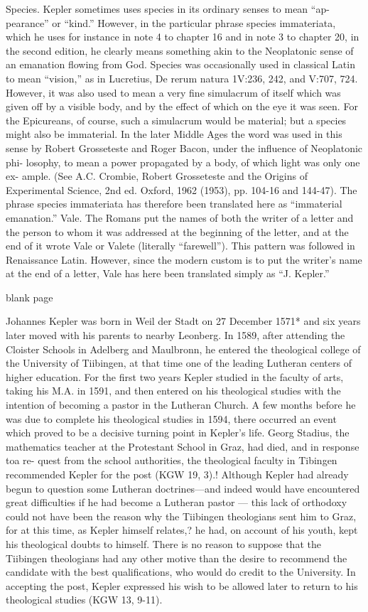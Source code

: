 \documentclass{article}
\begin{document}
Species. Kepler sometimes uses species in its ordinary senses to mean “ap-
pearance” or “kind.” However, in the particular phrase species immateriata,
which he uses for instance in note 4 to chapter 16 and in note 3 to chapter 20, in
the second edition, he clearly means something akin to the Neoplatonic sense of
an emanation flowing from God. Species was occasionally used in classical Latin
to mean “vision,” as in Lucretius, De rerum natura 1V:236, 242, and V:707, 724.
However, it was also used to mean a very fine simulacrum of itself which was
given off by a visible body, and by the effect of which on the eye it was seen. For
the Epicureans, of course, such a simulacrum would be material; but a species
might also be immaterial. In the later Middle Ages the word was used in this sense
by Robert Grosseteste and Roger Bacon, under the influence of Neoplatonic phi-
losophy, to mean a power propagated by a body, of which light was only one ex-
ample. (See A.C. Crombie, Robert Grosseteste and the Origins of Experimental
Science, 2nd ed. Oxford, 1962 (1953), pp. 104-16 and 144-47). The phrase species
immateriata has therefore been translated here as “immaterial emanation.”
Vale. The Romans put the names of both the writer of a letter and the person to
whom it was addressed at the beginning of the letter, and at the end of it wrote
Vale or Valete (literally “farewell”). This pattern was followed in Renaissance
Latin. However, since the modern custom is to put the writer’s name at the end of
a letter, Vale has here been translated simply as “J. Kepler.”

blank page


Johannes Kepler was born in Weil der Stadt on 27 December 1571* and
six years later moved with his parents to nearby Leonberg. In 1589, after
attending the Cloister Schools in Adelberg and Maulbronn, he entered the
theological college of the University of Tiibingen, at that time one of the
leading Lutheran centers of higher education. For the first two years
Kepler studied in the faculty of arts, taking his M.A. in 1591, and then
entered on his theological studies with the intention of becoming a pastor
in the Lutheran Church. A few months before he was due to complete his
theological studies in 1594, there occurred an event which proved to be a
decisive turning point in Kepler’s life. Georg Stadius, the mathematics
teacher at the Protestant School in Graz, had died, and in response toa re-
quest from the school authorities, the theological faculty in Tibingen
recommended Kepler for the post (KGW 19, 3).! Although Kepler had
already begun to question some Lutheran doctrines—and indeed would
have encountered great difficulties if he had become a Lutheran pastor —
this lack of orthodoxy could not have been the reason why the Tiibingen
theologians sent him to Graz, for at this time, as Kepler himself relates,?
he had, on account of his youth, kept his theological doubts to himself.
There is no reason to suppose that the Tiibingen theologians had any
other motive than the desire to recommend the candidate with the best
qualifications, who would do credit to the University. In accepting the
post, Kepler expressed his wish to be allowed later to return to his
theological studies (KGW 13, 9-11).
\end{document}
